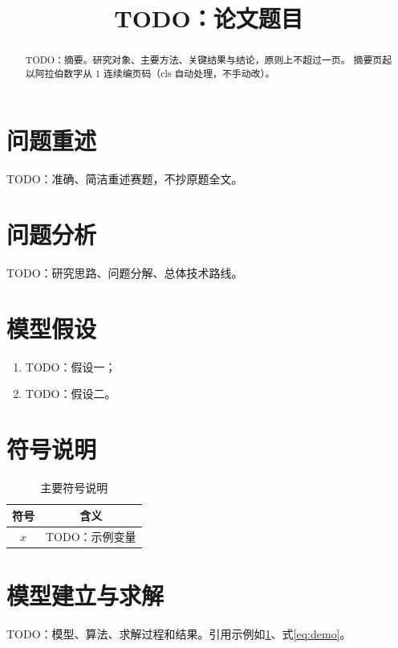 \documentclass{cumcmthesis}
\title{TODO：论文题目}
\begin{document}
\maketitle

\begin{abstract}
TODO：摘要。研究对象、主要方法、关键结果与结论，原则上不超过一页。
摘要页起以阿拉伯数字从 1 连续编页码（cls 自动处理，不手动改）。

\end{abstract}


\section{问题重述}
\label{sec:restate}
TODO：准确、简洁重述赛题，不抄原题全文。

\section{问题分析}
\label{sec:analysis}
TODO：研究思路、问题分解、总体技术路线。

\section{模型假设}
\label{sec:assumptions}
\begin{enumerate}
    \item TODO：假设一；
    \item TODO：假设二。
\end{enumerate}

\section{符号说明}
\label{sec:symbols}
\begin{table}[htbp]
    \centering
    \caption{主要符号说明}
    \label{tab:symbols}
    \begin{tabular}{cc}
        \toprule[0.8pt]
        符号 & 含义 \\
        \midrule[0.5pt]
        $x$ & TODO：示例变量 \\
        \bottomrule[0.8pt]
    \end{tabular}
\end{table}

\section{模型建立与求解}
\label{sec:model}
TODO：模型、算法、求解过程和结果。引用示例如\cref{tab:symbols}、式\cref{eq:demo}。
\end{document}
